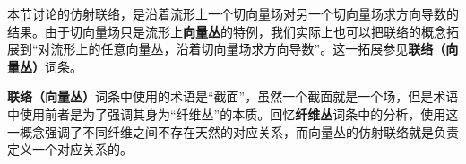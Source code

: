 本节讨论的仿射联络，是沿着流形上一个切向量场对另一个切向量场求方向导数的结果。由于切向量场只是流形上\textbf{向量丛}的特例，我们实际上也可以把联络的概念拓展到“对流形上的任意向量丛，沿着切向量场求方向导数”。这一拓展参见\textbf{联络（向量丛）}词条。

\textbf{联络（向量丛）}词条中使用的术语是“截面”，虽然一个截面就是一个场，但是术语中使用前者是为了强调其身为“纤维丛”的本质。回忆\textbf{纤维丛}词条中的分析，使用这一概念强调了不同纤维之间不存在天然的对应关系，而向量丛的仿射联络就是负责定义一个对应关系的。



